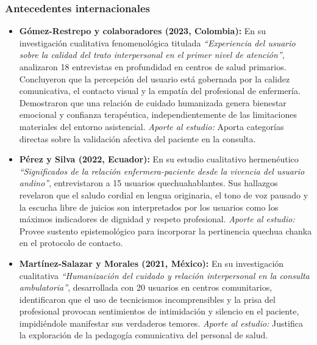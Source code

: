 \subsubsection{Antecedentes internacionales}
\label{sec:3.1.1_internacionales}
\begin{itemize}
    \item \textbf{Gómez-Restrepo y colaboradores (2023, Colombia):} En su investigación cualitativa fenomenológica titulada \textit{``Experiencia del usuario sobre la calidad del trato interpersonal en el primer nivel de atención''}, analizaron 18 entrevistas en profundidad en centros de salud primarios. Concluyeron que la percepción del usuario está gobernada por la calidez comunicativa, el contacto visual y la empatía del profesional de enfermería. Demostraron que una relación de cuidado humanizada genera bienestar emocional y confianza terapéutica, independientemente de las limitaciones materiales del entorno asistencial. \textit{Aporte al estudio:} Aporta categorías directas sobre la validación afectiva del paciente en la consulta.
    \item \textbf{Pérez y Silva (2022, Ecuador):} En su estudio cualitativo hermenéutico \textit{``Significados de la relación enfermera-paciente desde la vivencia del usuario andino''}, entrevistaron a 15 usuarios quechuahablantes. Sus hallazgos revelaron que el saludo cordial en lengua originaria, el tono de voz pausado y la escucha libre de juicios son interpretados por los usuarios como los máximos indicadores de dignidad y respeto profesional. \textit{Aporte al estudio:} Provee sustento epistemológico para incorporar la pertinencia quechua chanka en el protocolo de contacto.
    \item \textbf{Martínez-Salazar y Morales (2021, México):} En su investigación cualitativa \textit{``Humanización del cuidado y relación interpersonal en la consulta ambulatoria''}, desarrollada con 20 usuarios en centros comunitarios, identificaron que el uso de tecnicismos incomprensibles y la prisa del profesional provocan sentimientos de intimidación y silencio en el paciente, impidiéndole manifestar sus verdaderos temores. \textit{Aporte al estudio:} Justifica la exploración de la pedagogía comunicativa del personal de salud.
\end{itemize}

